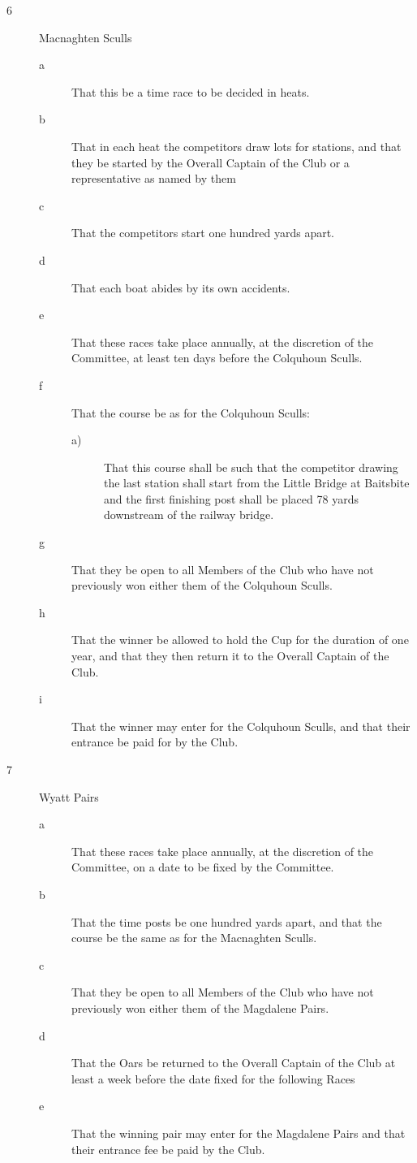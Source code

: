 \documentclass{article}
\begin{document}
\begin{description}
\begin{description}
	\item[6]Macnaghten Sculls
	\begin{description}
		\item[a] That this be a time race to be decided in heats.
		\item[b] That in each heat the competitors draw lots for stations, and that they
		be started by the Overall Captain of the Club or a representative as
		named by them
		\item[c] That the competitors start one hundred yards apart.
		\item[d] That each boat abides by its own accidents.
		\item[e] That these races take place annually, at the discretion of the
		Committee, at least ten days before the Colquhoun Sculls.
		\item[f] That the course be as for the Colquhoun Sculls:
		\begin{description}
			\item[a)] That this course shall be such that the competitor drawing the
			last station shall start from the Little Bridge at Baitsbite and the
			first finishing post shall be placed 78 yards downstream of the
			railway bridge.
		\end{description}
		\item[g] That they be open to all Members of the Club who have not previously
		won either them of the Colquhoun Sculls.
		\item[h] That the winner be allowed to hold the Cup for the duration of one
		year, and that they then return it to the Overall Captain of the Club.
		\item[i] That the winner may enter for the Colquhoun Sculls, and that their
		entrance be paid for by the Club.\\
	\end{description}
	
	\item[7] Wyatt Pairs
	\begin{description}
		\item[a] That these races take place annually, at the discretion of the
		Committee, on a date to be fixed by the Committee.
		\item[b] That the time posts be one hundred yards apart, and that the course be
		the same as for the Macnaghten Sculls.
		\item[c] That they be open to all Members of the Club who have not previously
		won either them of the Magdalene Pairs.
		\item[d] That the Oars be returned to the Overall Captain of the Club at least a
		week before the date fixed for the following Races
		\item[e] That the winning pair may enter for the Magdalene Pairs and that their
		entrance fee be paid by the Club.\\
		

\end{description}
\end{description}
\end{description}
\end{document}
